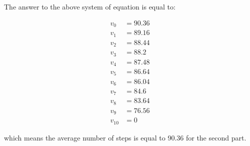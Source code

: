 \begin{solution}
The answer to the above system of equation is equal to:

$$
\begin{aligned}
v_0 &= 90.36 \\
v_1 &= 89.16 \\
v_2 &= 88.44 \\
v_3 &= 88.2 \\
v_4 &= 87.48 \\
v_5 &= 86.64 \\
v_6 &= 86.04 \\
v_7 &= 84.6 \\
v_8 &= 83.64 \\
v_9 &= 76.56 \\
v_{10} &= 0
\end{aligned}
$$

which means the average number of steps is equal to 90.36 for the second part.



\end{solution}